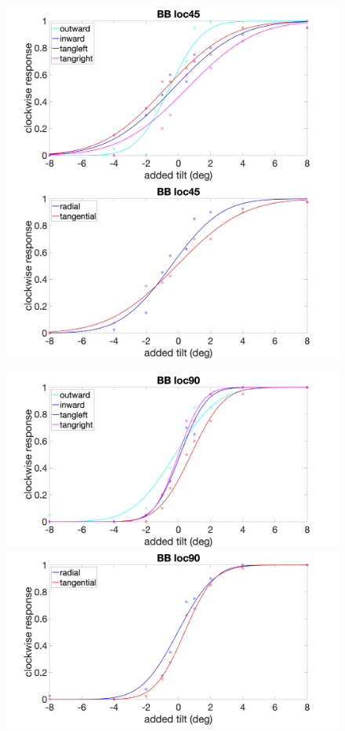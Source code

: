 \documentclass[11pt]{article} %
\begin{document}
\begin{figure}[H]
\centering %
\includegraphics[scale=.15]{Images/BB_PF_loc45_4conds.png}
\includegraphics[scale=.15]{Images/BB_PF_loc45_2conds.png}
\end{figure}
\begin{figure}[H]
\centering %
\includegraphics[scale=.15]{Images/BB_PF_loc90_4conds.png}
\includegraphics[scale=.15]{Images/BB_PF_loc90_2conds.png}
\end{figure}
\end{document}
